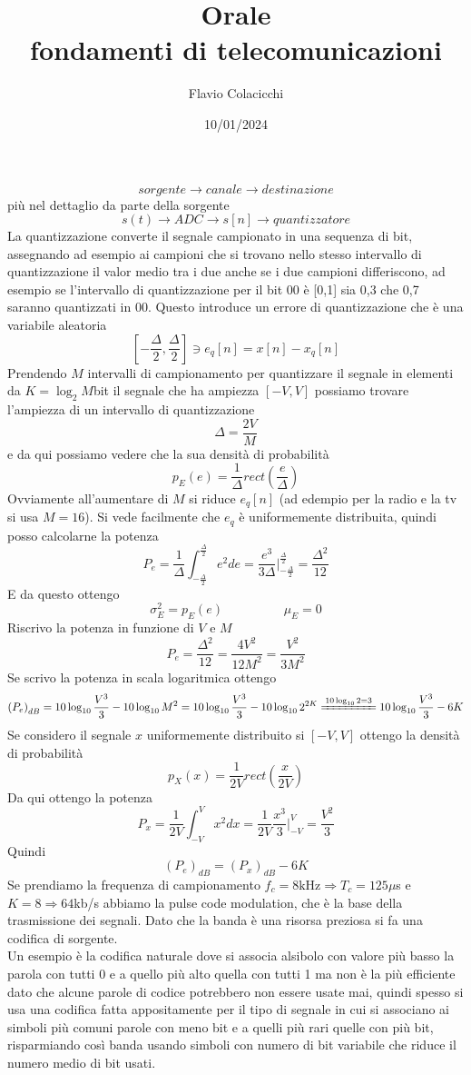 \documentclass{article}
\title{Orale\\\normalsize fondamenti di telecomunicazioni}
\author{Flavio Colacicchi}
\date{10/01/2024}
\begin{document}
\maketitle
\LARGE\[sorgente\to\boxed{canale}\to destinazione\]\normalsize
più nel dettaglio da parte della sorgente
\[s(t)\to\boxed{ADC}\to s[n]\to\boxed{quantizzatore}\]
La quantizzazione converte il segnale campionato in una sequenza di bit, assegnando ad esempio ai campioni che si trovano nello stesso intervallo di quantizzazione il valor medio tra i due anche se i due campioni differiscono, ad esempio se l'intervallo di quantizzazione per il bit 00 è [0,1] sia 0,3 che 0,7 saranno quantizzati in 00. Questo introduce un errore di quantizzazione che è una variabile aleatoria
\[\left[-\frac{\Delta}{2},\frac{\Delta}{2}\right]\ni e_q[n]=x[n]-x_q[n]\]
Prendendo \(M\) intervalli di campionamento per quantizzare il segnale in elementi da \(K=\log_{2}M\)bit il segnale che ha ampiezza \([-V,V]\) possiamo trovare l'ampiezza di un intervallo di quantizzazione
\[\Delta=\frac{2V}{M}\]
e da qui possiamo vedere che la sua densità di probabilità
\[p_E(e)=\frac{1}{\Delta}rect\left(\frac{e}{\Delta}\right)\]
Ovviamente all'aumentare di \(M\) si riduce \(e_q[n]\) (ad edempio per la radio e la tv si usa \(M=16\)). Si vede facilmente che \(e_q\) è uniformemente distribuita, quindi posso calcolarne la potenza
\[P_e=\frac{1}{\Delta}\int_{-\frac{\Delta}{2}}^\frac{\Delta}{2}e^2de=\frac{e^3}{3\Delta}\Big|_{-\frac{\Delta}{2}}^\frac{\Delta}{2}=\frac{\Delta^2}{12}\]
E da questo ottengo
\[\sigma^2_E=p_E(e)\hspace{2cm}\mu_E=0\]
Riscrivo la potenza in funzione di \(V\) e \(M\)
\[P_e=\frac{\Delta^2}{12}=\frac{4V^2}{12M^2}=\frac{V^2}{3M^2}\]
Se scrivo la potenza in scala logaritmica ottengo
\[{(P_e)}_{dB}=10\log_{10}\frac{V^3}{3}-10\log_{10}M^2=10\log_{10}\frac{V^3}{3}-10\log_{10}2^{2K}\xlongequal{10\log_{10}2=3}10\log_{10}\frac{V^3}{3}-6K\]
Se considero il segnale \(x\) uniformemente distribuito si \([-V,V]\) ottengo la densità di probabilità
\[p_X(x)=\frac{1}{2V}rect\left(\frac{x}{2V}\right)\]
Da qui ottengo la potenza
\[P_x=\frac{1}{2V}\int_{-V}^V x^2dx=\frac{1}{2V}\frac{x^3}{3}\Bigg|_{-V}^V=\frac{V^2}{3}\]
Quindi
\[{(P_e)}_{dB}={(P_x)}_{dB}-6K\]
Se prendiamo la frequenza di campionamento \(f_c=8\text{kHz}\Rightarrow T_c=125\mu\)s e \(K=8\Rightarrow 64\)kb/s abbiamo la pulse code modulation, che è la base della trasmissione dei segnali. Dato che la banda è una risorsa preziosa si fa una codifica di sorgente.\\
Un esempio è la codifica naturale dove si associa alsibolo con valore più basso la parola con tutti 0 e a quello più alto quella con tutti 1 ma non è la più efficiente dato che alcune parole di codice potrebbero non essere usate mai, quindi spesso si usa una codifica fatta appositamente per il tipo di segnale in cui si associano ai simboli più comuni parole con meno bit e a quelli più rari quelle con più bit, risparmiando così banda usando simboli con numero di bit variabile che riduce il numero medio di bit usati.\\
\end{document}

